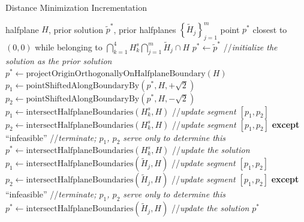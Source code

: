 \documentclass{article}
\begin{document}
\begin{algorithm}
\caption{Distance Minimization Incrementation}
\label{alg:incrementation}
\begin{algorithmic}
\REQUIRE 	halfplane $ H $, prior solution $\tilde p^* $, prior halfplanes $ \left\{\tilde H_j\right\}_{j=1}^{m}$
\ENSURE 	point $ p^* $ closest to $ (0,0) $ while belonging to $ \bigcap\limits_{k=1}^{4} H_k^s \bigcap\limits_{j=1}^{m} \tilde H_j \cap H $
\STATE $ p^* \leftarrow \tilde p^* $ //\textit{initialize the solution as the prior solution}
	\STATE $ p^* \leftarrow \text{projectOriginOrthogonallyOnHalfplaneBoundary}(H) $
	\STATE $ p_1 \leftarrow \text{pointShiftedAlongBoundaryBy} (p^*, H, +\sqrt{2}) $
	\STATE $ p_2 \leftarrow \text{pointShiftedAlongBoundaryBy} (p^*, H, -\sqrt{2}) $
			\STATE $  p_1 \leftarrow \text{intersectHalfplaneBoundaries}(H_k^s, H) $ //\textit{update segment $ [p_1, p_2] $}
			\STATE $ p_2 \leftarrow \text{intersectHalfplaneBoundaries}(H_k^s, H) $ //\textit{update segment $ [p_1, p_2] $}
			\STATE \textbf{except} ``infeasible'' //\textit{terminate; $ p_1 $, $ p_2 $ serve only to determine this}
		\ENDIF
			\STATE $ p^* \leftarrow \text{intersectHalfplaneBoundaries}(H_k^s, H) $ //\textit{update the solution}
		\ENDIF
	\ENDFOR
			\STATE $  p_1 \leftarrow \text{intersectHalfplaneBoundaries}(\tilde H_j, H) $ //\textit{update segment $ [p_1, p_2] $}
			\STATE $ p_2 \leftarrow \text{intersectHalfplaneBoundaries}(\tilde H_j, H) $ //\textit{update segment $ [p_1, p_2] $}
			\STATE \textbf{except} ``infeasible'' //\textit{terminate; $ p_1 $, $ p_2 $ serve only to determine this}
		\ENDIF
			\STATE $ p^* \leftarrow \text{intersectHalfplaneBoundaries}(\tilde H_j, H) $ //\textit{update the solution}
		\ENDIF
	\ENDFOR
\ENDIF
\RETURN $ p^* $
\end{algorithmic}
\end{algorithm}



\end{document}
